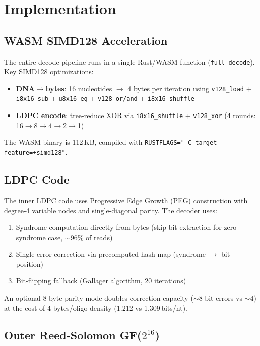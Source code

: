 \documentclass[11pt,a4paper]{article}
\begin{document}
\section{Implementation}

\subsection{WASM SIMD128 Acceleration}

The entire decode pipeline runs in a single Rust/WASM function (\texttt{full\_decode}). Key SIMD128 optimizations:

\begin{itemize}[noitemsep]
\item \textbf{DNA$\to$bytes}: 16 nucleotides $\to$ 4 bytes per iteration using \texttt{v128\_load} + \texttt{i8x16\_sub} + \texttt{u8x16\_eq} + \texttt{v128\_or/and} + \texttt{i8x16\_shuffle}
\item \textbf{LDPC encode}: tree-reduce XOR via \texttt{i8x16\_shuffle} + \texttt{v128\_xor} (4 rounds: 16$\to$8$\to$4$\to$2$\to$1)
\end{itemize}

The WASM binary is 112\,KB, compiled with \texttt{RUSTFLAGS="-C target-feature=+simd128"}.

\subsection{LDPC Code}

The inner LDPC code uses Progressive Edge Growth (PEG) construction with degree-4 variable nodes and single-diagonal parity. The decoder uses:
\begin{enumerate}[noitemsep]
\item Syndrome computation directly from bytes (skip bit extraction for zero-syndrome case, $\sim$96\% of reads)
\item Single-error correction via precomputed hash map (syndrome $\to$ bit position)
\item Bit-flipping fallback (Gallager algorithm, 20 iterations)
\end{enumerate}

An optional 8-byte parity mode doubles correction capacity ($\sim$8 bit errors vs $\sim$4) at the cost of 4 bytes/oligo density (1.212 vs 1.309\,bits/nt).

\subsection{Outer Reed-Solomon GF($2^{16}$)}
\end{document}
